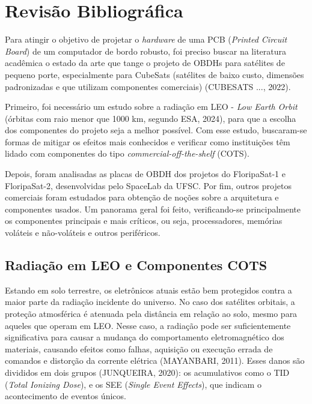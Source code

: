 \chapter{Revisão Bibliográfica}

Para atingir o objetivo de projetar o \textit{hardware} de uma PCB (\textit{Printed Circuit Board}) de um computador de bordo robusto, foi preciso buscar na literatura acadêmica o estado da arte que tange o projeto de OBDHs para satélites de pequeno porte, especialmente para CubeSats (satélites de baixo custo, dimensões padronizadas e que utilizam componentes comerciais) (CUBESATS ..., 2022).
 
Primeiro, foi necessário um estudo sobre a radiação em LEO - \textit{Low Earth Orbit} (órbitas com raio menor que 1000 km, segundo ESA, 2024), para que a escolha dos componentes do projeto seja a melhor possível. Com esse estudo, buscaram-se formas de mitigar os efeitos mais conhecidos e verificar como instituições têm lidado com componentes do tipo \textit{commercial-off-the-shelf} (COTS).%

Depois, foram analisadas as placas de OBDH dos projetos do FloripaSat-1 e FloripaSat-2, desenvolvidas pelo SpaceLab da UFSC. Por fim, outros projetos comerciais foram estudados para obtenção de noções sobre a arquitetura e componentes usados. Um panorama geral foi feito, verificando-se principalmente os componentes principais e mais críticos, ou seja, processadores, memórias voláteis e não-voláteis e outros periféricos.

\section{Radiação em LEO e Componentes COTS}

Estando em solo terrestre, os eletrônicos atuais estão bem protegidos contra a maior parte da radiação incidente do universo. No caso dos satélites orbitais, a proteção atmosférica é atenuada pela distância em relação ao solo, mesmo para aqueles que operam em LEO. Nesse caso, a radiação pode ser suficientemente significativa para causar a mudança do comportamento eletromagnético dos materiais, causando efeitos como falhas, aquisição ou execução errada de comandos e distorção da corrente elétrica (MAYANBARI, 2011).  Esses danos são divididos em dois grupos (JUNQUEIRA, 2020): os acumulativos como o TID (\textit{Total Ionizing Dose}), e os SEE (\textit{Single Event Effects}), que indicam o acontecimento de eventos únicos. 

